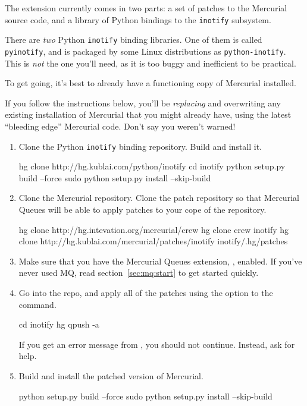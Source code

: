 The extension currently comes in two parts: a set of patches to the
Mercurial source code, and a library of Python bindings to the
\texttt{inotify} subsystem.
\begin{note}
  There are \emph{two} Python \texttt{inotify} binding libraries.  One
  of them is called \texttt{pyinotify}, and is packaged by some Linux
  distributions as \texttt{python-inotify}.  This is \emph{not} the
  one you'll need, as it is too buggy and inefficient to be practical.
\end{note}
To get going, it's best to already have a functioning copy of
Mercurial installed.
\begin{note}
  If you follow the instructions below, you'll be \emph{replacing} and
  overwriting any existing installation of Mercurial that you might
  already have, using the latest ``bleeding edge'' Mercurial code.
  Don't say you weren't warned!
\end{note}
\begin{enumerate}
\item Clone the Python \texttt{inotify} binding repository.  Build and
  install it.
  \begin{codesample4}
    hg clone http://hg.kublai.com/python/inotify
    cd inotify
    python setup.py build --force
    sudo python setup.py install --skip-build
  \end{codesample4}
\item Clone the  Mercurial repository.  Clone the
   patch repository so that Mercurial Queues will be
  able to apply patches to your cope of the  repository.
  \begin{codesample4}
    hg clone http://hg.intevation.org/mercurial/crew
    hg clone crew inotify
    hg clone http://hg.kublai.com/mercurial/patches/inotify inotify/.hg/patches
  \end{codesample4}
\item Make sure that you have the Mercurial Queues extension,
  , enabled.  If you've never used MQ, read
  section~\ref{sec:mq:start} to get started quickly.
\item Go into the  repo, and apply all of the
   patches using the  option to the
   command.
  \begin{codesample4}
    cd inotify
    hg qpush -a
  \end{codesample4}
  If you get an error message from , you should not
  continue.  Instead, ask for help.
\item Build and install the patched version of Mercurial.
  \begin{codesample4}
    python setup.py build --force
    sudo python setup.py install --skip-build
  \end{codesample4}
\end{enumerate}
